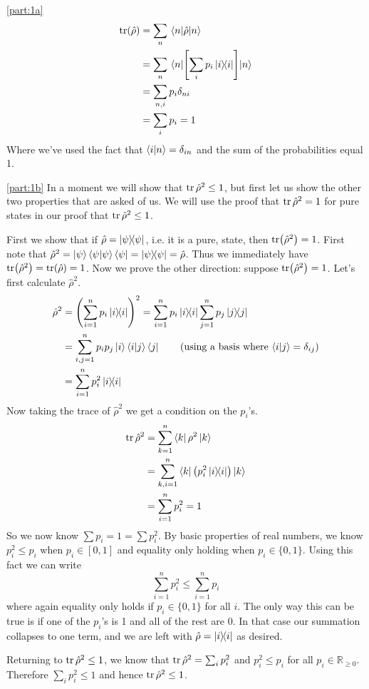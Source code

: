 \documentclass[boxes,pages]{homework}
\makeatletter
\newcommand{\R}{\mathbb{R}}
\numberwithin{@problem}{section}
\makeatother
\begin{document}
\begin{solution}
	\ref{part:1a}
	\begin{align*}
		\tr(\hat{\rho}) & = \sum_n\expval{\hat{\rho}}{n}                \\
		                & = \sum_n\expval{\qty[\sum_ip_i\ketbra{i}]}{n} \\
		                & = \sum_{n, i}p_i\delta_{ni}                   \\
		                & = \sum_i p_i = 1
	\end{align*}
	Where we've used the fact that $\braket{i}{n} = \delta_{in}$ and the sum of the probabilities equal 1.

	\ref{part:1b}
	In a moment we will show that $\tr \hat{\rho}^2 \leq 1$, but first let us show the other two properties that are asked of us.
	We will use the proof that $\tr \hat{\rho}^2 = 1$ for pure states in our proof that $\tr \hat{\rho}^2 \leq 1$.

	First we show that if $\hat{\rho} = \ketbra{\psi}$, i.e. it is a pure, state, then $\tr(\hat{\rho}^2) = 1$. First note that $\hat{\rho}^2 = \ket{\psi}\braket{\psi}{\psi}\bra{\psi} = \ketbra{\psi} = \hat{\rho}$. Thus we immediately have $\tr(\hat{\rho}^2) = \tr(\hat{\rho}) = 1$.
	Now we prove the other direction: suppose $\tr(\hat{\rho}^2) = 1$. Let's first calculate $\hat{\rho}^2$.
	\begin{align*}
		\hat{\rho}^2 & = \qty(\sum_{i = 1}^n p_i\ketbra{i}{i})^2 = \sum_{i = 1}^n p_i\ketbra{i}{i}\sum_{j = 1}^n p_j\ketbra{j}{j}   \\
		             & = \sum_{i,j = 1}^n p_ip_j\ket{i}\braket{i}{j}\bra{j} \tag{using a basis where $\braket{i}{j} = \delta_{ij}$} \\
		             & = \sum_{i = 1}^n p_i^2\ketbra{i}{i}
	\end{align*}
	Now taking the trace of $\hat{\rho}^2$ we get a condition on the $p_i$'s.
	\begin{align*}
		\tr \hat{\rho}^2 & = \sum_{k = 1}^n\bra{k}\rho^2\ket{k}                     \\
		                 & = \sum_{k,i = 1}^n\bra{k}\qty(p_i^2\ketbra{i}{i})\ket{k} \\
		                 & = \sum_{i = 1}^n p_i^2 = 1
	\end{align*}
	So we now know $\sum p_i = 1 = \sum p_i^2$. By basic properties of real numbers, we know $p_i^2 \leq p_i$ when $p_i\in[0, 1]$ and equality only holding when $p_i \in\{0, 1\}$. Using this fact we can write
	\begin{equation*}
		\sum_{i = 1}^n p_i^2 \leq \sum_{i = 1}^n p_i
	\end{equation*}
	where again equality only holds if $p_i\in\{0, 1\}$ for all $i$. The only way this can be true is if one of the $p_i$'s is 1 and all of the rest are 0. In that case our summation collapses to one term, and we are left with $\hat{\rho} = \ketbra{i}$ as desired.

	Returning to $\tr \hat{\rho}^2 \leq 1$, we know that $\tr \hat{\rho}^2  = \sum_i p_i^2$ and $p_i^2 \leq p_i$ for all $p_i\in\R_{\geq 0}$. Therefore $\sum_i p_i^2 \leq 1$ and hence $\tr \hat{\rho}^2 \leq 1$.
\end{solution}
\end{document}
